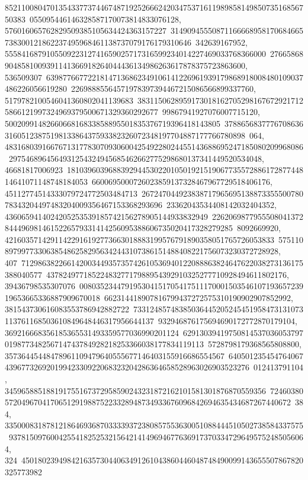 {{{85211008047013543377374467487192526662420347537161198985814985073516856750383\
055095446146328587170073814833076128, 576016065762829509385105634424363157227\
31490945550871166668958170684665738300121862237495968461138737079176179310646\
342639167952, 555841687910550922312741659025717316599234014227469033768366000\
276658689048581009391141366918264044436134986263617878375723863600, 536509307\
63987766772218147136862349106141226961939179868918008480109037486226056619280\
22698885564571978397394467215086566899337760, 5179782100546041360802041139683\
38311506289591730181627052981676729217125866121997324969379500671329360292677\
99867941927076007715120, 5002099148266066816833858895501835376719396418143805\
37886568377767086363160512387519813386437593382326072348197704887177766780898\
064, 483168039166767131778307093060042549228024455143688695247185080209968086\
2975468964564931254324945685462662775298680137341449520534048, 46681817006923\
18103960396883929445302201050192151906773557288617287744814641071148748184053\
6600695000726023859137328467967729518406176, 45112774514333079724772503484713\
26724704492383871796569513887335550078078343204497483204009356467153368293696\
23362043534408142032404352, 4360659414024205253539185742156278905144933832949\
22620698779555080413728444969814615226579331414256095388606735020417328279285\
8092669920, 42160357142911422916192773663018883199576791890358051765726053833\
575110897997733063854862582956342443107386151488408221756073230372728928, 407\
71298638226614200344935735742610536940122088863824647622038273136175388040577\
4378249771852248327717988954392910325277710928494611802176, 39436798535307076\
00803523447919530415170541751117000150354610719365723919653665336887909670018\
662314418907816799437272575310190902907852992, 381543730616083553786942882722\
73312485748385036445205245451958473131073113761168503610849648446317956644137\
932946876175694690172772870179104, 369216668356185365531493359577036990201124\
62913039419750814537036053797019877348256714743784928218253366038177834119113\
5728798179368565808800, 35736445448478961109479640555677146403155916686554567\
64050123545476406743967732692019942330922068323204286364658528963026903523276\
012413791104, 345965885188191755167372958590243231872162101581301876870559356\
72460380572049670417065129198875223328948734933676096842694635434687267440672\
384, 335000831878121864693687033339372380857553630051088444510502738584337575\
937815097600425541825253215642141496946776369173703347296495752485056064, 324\
45018023949842163573044063491261043860446048748490099143655507867820325773982\
}}}
